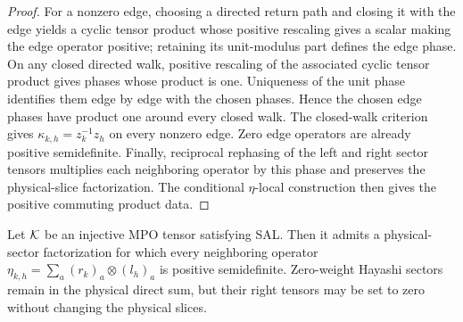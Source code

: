 \begin{proof}
    \leanok
    For a nonzero edge, choosing a directed return path and closing it with the
    edge yields a cyclic tensor product whose positive rescaling gives a scalar
    making the edge operator positive; retaining its unit-modulus part defines
    the edge phase. On any closed directed walk, positive rescaling of the
    associated cyclic tensor product gives phases whose product is one.
    Uniqueness of the unit phase identifies them edge by edge with the chosen
    phases. Hence the chosen edge phases have product one around every closed
    walk. The closed-walk criterion gives
    $\kappa_{k,h}=z_k^{-1}z_h$ on every nonzero edge. Zero edge operators are
    already positive semidefinite. Finally, reciprocal rephasing of the left
    and right sector tensors multiplies each neighboring operator by this
    phase and preserves the physical-slice factorization. The conditional
    $\eta$-local construction then gives the positive commuting product data.
\end{proof}

\begin{lemma}%
    \label{thm:mpdo_eta_coherent_positive_choice}
    \leanok
    Let ${\cal K}$ be an injective MPO tensor satisfying SAL. Then it admits
    a physical-sector factorization for which every neighboring operator
    $\eta_{k,h}=\sum_a (r_k)_a\otimes(l_h)_a$ is positive semidefinite.
    Zero-weight Hayashi sectors remain in the physical direct sum, but their
    right tensors may be set to zero without changing the physical slices.
\end{lemma}

